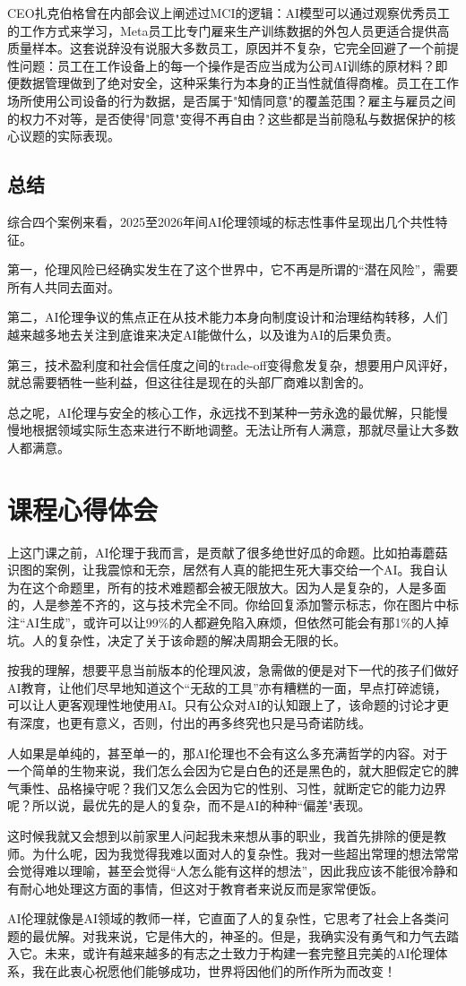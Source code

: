\documentclass[12pt,a4paper]{ctexart}
\begin{document}
CEO扎克伯格曾在内部会议上阐述过MCI的逻辑：AI模型可以通过观察优秀员工的工作方式来学习，Meta员工比专门雇来生产训练数据的外包人员更适合提供高质量样本。这套说辞没有说服大多数员工，原因并不复杂，它完全回避了一个前提性问题：员工在工作设备上的每一个操作是否应当成为公司AI训练的原材料？即便数据管理做到了绝对安全，这种采集行为本身的正当性就值得商榷。员工在工作场所使用公司设备的行为数据，是否属于"知情同意"的覆盖范围？雇主与雇员之间的权力不对等，是否使得"同意"变得不再自由？这些都是当前隐私与数据保护的核心议题的实际表现。

\subsection{总结}
综合四个案例来看，2025至2026年间AI伦理领域的标志性事件呈现出几个共性特征。

第一，伦理风险已经确实发生在了这个世界中，它不再是所谓的“潜在风险”，需要所有人共同去面对。

第二，AI伦理争议的焦点正在从技术能力本身向制度设计和治理结构转移，人们越来越多地去关注到底谁来决定AI能做什么，以及谁为AI的后果负责。

第三，技术盈利度和社会信任度之间的trade-off变得愈发复杂，想要用户风评好，就总需要牺牲一些利益，但这往往是现在的头部厂商难以割舍的。

总之呢，AI伦理与安全的核心工作，永远找不到某种一劳永逸的最优解，只能慢慢地根据领域实际生态来进行不断地调整。无法让所有人满意，那就尽量让大多数人都满意。

\section{课程心得体会}

上这门课之前，AI伦理于我而言，是贡献了很多绝世好瓜的命题。比如拍毒蘑菇识图的案例，让我震惊和无奈，居然有人真的能把生死大事交给一个AI。我自认为在这个命题里，所有的技术难题都会被无限放大。因为人是复杂的，人是多面的，人是参差不齐的，这与技术完全不同。你给回复添加警示标志，你在图片中标注“AI生成”，或许可以让99\%的人都避免陷入麻烦，但依然可能会有那1\%的人掉坑。人的复杂性，决定了关于该命题的解决周期会无限的长。

按我的理解，想要平息当前版本的伦理风波，急需做的便是对下一代的孩子们做好AI教育，让他们尽早地知道这个“无敌的工具”亦有糟糕的一面，早点打碎滤镜，可以让人更客观理性地使用AI。只有公众对AI的认知跟上了，该命题的讨论才更有深度，也更有意义，否则，付出的再多终究也只是马奇诺防线。

人如果是单纯的，甚至单一的，那AI伦理也不会有这么多充满哲学的内容。对于一个简单的生物来说，我们怎么会因为它是白色的还是黑色的，就大胆假定它的脾气秉性、品格操守呢？我们又怎么会因为它的性别、习性，就断定它的能力边界呢？所以说，最优先的是人的复杂，而不是AI的种种“偏差"表现。

这时候我就又会想到以前家里人问起我未来想从事的职业，我首先排除的便是教师。为什么呢，因为我觉得我难以面对人的复杂性。我对一些超出常理的想法常常会觉得难以理喻，甚至会觉得“人怎么能有这样的想法”，因此我应该不能很冷静和有耐心地处理这方面的事情，但这对于教育者来说反而是家常便饭。

AI伦理就像是AI领域的教师一样，它直面了人的复杂性，它思考了社会上各类问题的最优解。对我来说，它是伟大的，神圣的。但是，我确实没有勇气和力气去踏入它。未来，或许有越来越多的有志之士致力于构建一套完整且完美的AI伦理体系，我在此衷心祝愿他们能够成功，世界将因他们的所作所为而改变！
\end{document}
